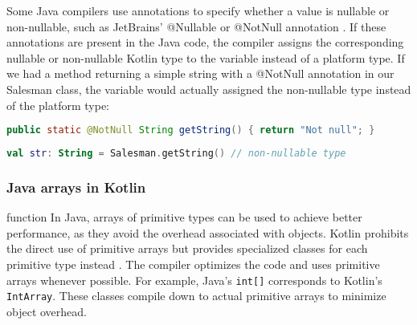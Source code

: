 \documentclass[a4paper,11pt]{article}
\begin{document}
Some Java compilers use annotations \cite{interop-nullability-annotations} to specify whether a value is nullable or non-nullable, such as JetBrains' @Nullable or @NotNull annotation \cite{JetBrains-annotations}. If these annotations are present in the Java code, the compiler assigns the corresponding nullable or non-nullable Kotlin type to the variable instead of a platform type. If we had a method returning a simple string with a @NotNull annotation in our Salesman class, the variable would actually assigned the non-nullable type instead of the platform type:
\begin{lstlisting}[language=Java]
public static @NotNull String getString() { return "Not null"; }
\end{lstlisting}
\begin{lstlisting}[language=Kotlin]
val str: String = Salesman.getString() // non-nullable type
\end{lstlisting}

\subsubsection{Java arrays in Kotlin}function
In Java, arrays of primitive types can be used to achieve better performance, as they avoid the overhead associated with objects. Kotlin prohibits the direct use of primitive arrays but provides specialized classes for each primitive type instead \cite{interop-arrays}. The compiler optimizes the code and uses primitive arrays whenever possible. For example, Java's \texttt{int[]} corresponds to Kotlin's \texttt{IntArray}. These classes compile down to actual primitive arrays to minimize object overhead.
\end{document}
